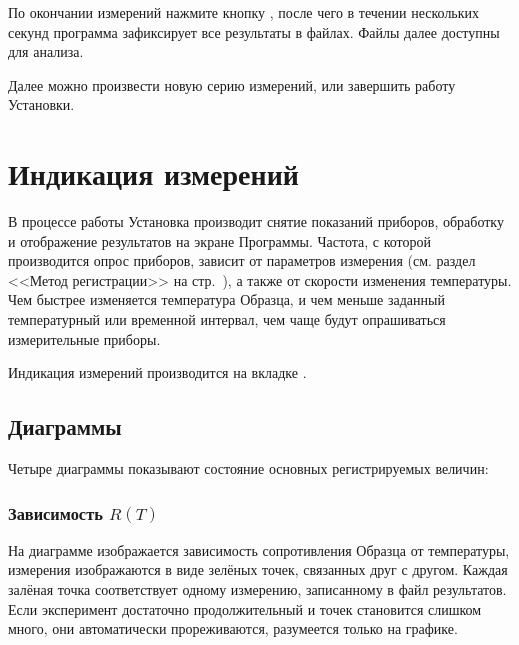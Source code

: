 \documentclass[12pt, a4paper, twocolumn]{report}
\begin{document}

По окончании измерений нажмите кнопку , после чего в течении нескольких секунд программа зафиксирует все результаты в файлах. Файлы далее доступны для анализа.

Далее можно произвести новую серию измерений, или завершить работу Установки.

\section{Индикация измерений}

В процессе работы Установка производит снятие показаний приборов, обработку и отображение результатов на экране Программы. Частота, с которой производится опрос приборов, зависит от параметров измерения (см. раздел <<Метод регистрации>> на стр.~\pageref{sec_reg_method}), а также от скорости изменения температуры. Чем быстрее изменяется температура Образца, и чем меньше заданный температурный или временной интервал, чем чаще будут опрашиваться измерительные приборы.

Индикация измерений производится на вкладке .

\subsection{Диаграммы}

Четыре диаграммы показывают состояние основных регистрируемых величин:

\subsubsection{Зависимость $R(T)$}

На диаграмме изображается зависимость сопротивления Образца от температуры, измерения изображаются в виде зелёных точек, связанных друг с другом. Каждая залёная точка соответствует одному измерению, записанному в файл результатов. Если эксперимент достаточно продолжительный и точек становится слишком много, они автоматически прореживаются, разумеется только на графике.
\end{document}
